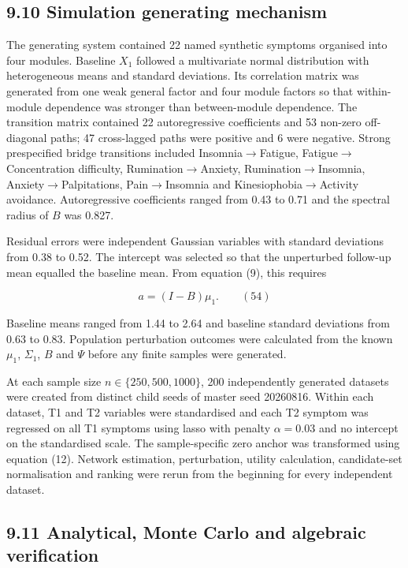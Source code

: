 \documentclass[11pt]{article}
\begin{document}
\subsection{9.10 Simulation generating
mechanism}\label{simulation-generating-mechanism}

The generating system contained 22 named synthetic symptoms organised
into four modules. Baseline \(X_{1}\) followed a multivariate normal
distribution with heterogeneous means and standard deviations. Its
correlation matrix was generated from one weak general factor and four
module factors so that within-module dependence was stronger than
between-module dependence. The transition matrix contained 22
autoregressive coefficients and 53 non-zero off-diagonal paths; 47
cross-lagged paths were positive and 6 were negative. Strong
prespecified bridge transitions included Insomnia\(\rightarrow\)Fatigue,
Fatigue\(\rightarrow\)Concentration difficulty,
Rumination\(\rightarrow\)Anxiety, Rumination\(\rightarrow\)Insomnia,
Anxiety\(\rightarrow\)Palpitations, Pain\(\rightarrow\)Insomnia and
Kinesiophobia\(\rightarrow\)Activity avoidance. Autoregressive
coefficients ranged from 0.43 to 0.71 and the spectral radius of \(B\)
was 0.827.

Residual errors were independent Gaussian variables with standard
deviations from 0.38 to 0.52. The intercept was selected so that the
unperturbed follow-up mean equalled the baseline mean. From equation
(9), this requires

\[a = (I - B)\mu_{1}.\quad\quad(54)\]

Baseline means ranged from 1.44 to 2.64 and baseline standard deviations
from 0.63 to 0.83. Population perturbation outcomes were calculated from
the known \(\mu_{1}\), \(\Sigma_{1}\), \(B\) and \(\Psi\) before any
finite samples were generated.

At each sample size \(n \in \{ 250,500,1000\}\), 200 independently
generated datasets were created from distinct child seeds of master seed
20260816. Within each dataset, T1 and T2 variables were standardised and
each T2 symptom was regressed on all T1 symptoms using lasso with
penalty \(\alpha = 0.03\) and no intercept on the standardised scale.
The sample-specific zero anchor was transformed using equation (12).
Network estimation, perturbation, utility calculation, candidate-set
normalisation and ranking were rerun from the beginning for every
independent dataset.

\subsection{9.11 Analytical, Monte Carlo and algebraic
verification}\label{analytical-monte-carlo-and-algebraic-verification}
\end{document}
